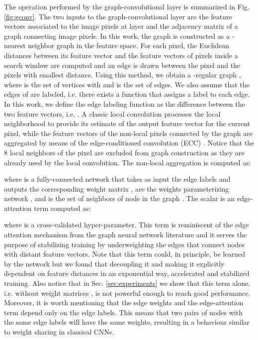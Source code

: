 \documentclass[journal]{IEEEtran}
\begin{document}
The operation performed by the graph-convolutional layer is summarized in Fig. \ref{fig:gconv}. The two inputs to the graph-convolutional layer are the feature vectors  associated to the  image pixels at layer  and the adjacency matrix of a graph connecting image pixels. In this work, the graph is constructed as a -nearest neighbor graph in the feature space. For each pixel, the Euclidean distances between its feature vector and the feature vectors of pixels inside a search window are computed and an edge is drawn between the pixel and the  pixels with smallest distance. Using this method, we obtain a -regular graph , where  is the set of vertices with  and  is the set of edges. We also assume that the edges of  are labeled, i.e. there exists a function  that assigns a label to each edge. In this work, we define the edge labeling function as the difference between the two feature vectors, i.e. .  A classic  local convolution processes the local neighborhood to provide its estimate of the output feature vector for the current pixel, while the feature vectors of the non-local pixels connected by the graph are aggregated by means of the edge-conditioned convolution (ECC) \cite{simonovsky2017dynamic}. Notice that the 8 local neighbors of the pixel are excluded from graph construction as they are already used by the local convolution.
The non-local aggregation is computed as:

where  is a fully-connected network that takes as input the edge labels and outputs the corresponding weight matrix ,  are the weights parameterizing network , and  is the set of neighbors of node  in the graph . The scalar  is an edge-attention term computed as:

where  is a cross-validated hyper-parameter. This term is reminiscent of the edge attention mechanism from the graph neural network literature \cite{gong2019exploiting} and it serves the purpose of stabilizing training by underweighting the edges that connect nodes with distant feature vectors. Note that this term could, in principle, be learned by the  network but we found that decoupling it and making it explicitly dependent on feature distances in an exponential way, accelerated and stabilized training. Also notice that in Sec. \ref{sec:experiments} we show that this term alone, i.e. without weight matrices , is not powerful enough to reach good performance. Moreover, it is worth mentioning that the edge weights  and the edge-attention term  depend only on the edge labels. This means that two pairs of nodes with the same edge labels will have the same weights, resulting in a behaviour similar to weight sharing in classical CNNs.
\end{document}
